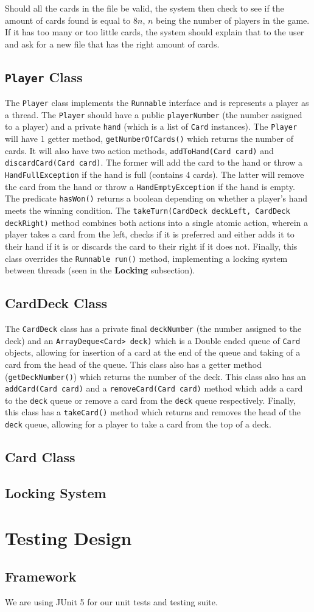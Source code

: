 \documentclass[a4paper, 11pt] {article}
\begin{document}
Should all the cards in the file be valid, the system then check to see if the amount of cards found is equal to $8n$, $n$ being the number of players in the game. If it has too many or too little cards, the system should explain that to the user and ask for a new file that has the right amount of cards.
\subsection*{\texttt{Player} Class}
The \texttt{Player} class implements the \texttt{Runnable} interface and is represents a player as a thread. 
The \texttt{Player} should have a public \texttt{playerNumber} (the number assigned to a player) and a private \texttt{hand} (which is a list of \texttt{Card} instances). 
The \texttt{Player} will have 1 getter method, \texttt{getNumberOfCards()} which returns the number of cards. 
It will also have two action methods, \texttt{addToHand(Card card)} and \texttt{discardCard(Card card)}. The former will add the card to the hand or throw a \texttt{HandFullException} if the hand is full (contains 4 cards). The latter will remove the card from the hand or throw a \texttt{HandEmptyException} if the hand is empty. 
The predicate \texttt{hasWon()} returns a boolean depending on whether a player's hand meets the winning condition. 
The \texttt{takeTurn(CardDeck deckLeft, CardDeck deckRight)} method combines both actions into a single atomic action, wherein a player takes a card from the left, checks if it is preferred and either adds it to their hand if it is or discards the card to their right if it does not. 
Finally, this class overrides the \texttt{Runnable run()} method, implementing a locking system between threads (seen in the \textbf{Locking} subsection).

\subsection*{CardDeck Class}
The \texttt{CardDeck} class has a private final \texttt{deckNumber} (the number assigned to the deck) and an \texttt{ArrayDeque<Card> deck)} which is a Double ended queue of \texttt{Card} objects, allowing for insertion of a card at the end of the queue and taking of a card from the head of the queue. This class also has a getter method (\texttt{getDeckNumber()}) which returns the number of the deck. This class also has an \texttt{addCard(Card card)} and a \texttt{removeCard(Card card)} method which adds a card to the \texttt{deck} queue or remove a card from the \texttt{deck} queue respectively. Finally, this class has a \texttt{takeCard()} method which returns and removes the head of the \texttt{deck} queue, allowing for a player to take a card from the top of a deck.

\subsection*{Card Class}

\subsection*{Locking System}
\pagebreak
\section*{Testing Design}
\subsection*{Framework}
We are using JUnit 5 for our unit tests and testing suite.
\end{document}
